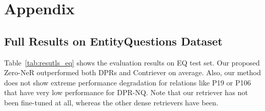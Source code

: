 \documentclass[letterpaper]{article} \usepackage{aaai23}  \usepackage{times}  \usepackage{helvet}  \usepackage{courier}  \usepackage[hyphens]{url}  \usepackage{graphicx} \urlstyle{rm} \def\UrlFont{\rm}  \usepackage{natbib}  \usepackage{caption} \frenchspacing  \setlength{\pdfpagewidth}{8.5in}  \setlength{\pdfpageheight}{11in}  \usepackage{algorithm}
\begin{document}




\appendix
\section{Appendix}\label{sec:appendix}


\subsection{Full Results on EntityQuestions Dataset}\label{sec:appendix_full_results}
Table~\ref{tab:resutls_eq} shows the evaluation results on EQ test set.
Our proposed Zero-NeR outperformed both DPRs and Contriever on average.
Also, our method does not show extreme performance degradation for relations like P19 or P106 that have very low performance for DPR-NQ.
Note that our retriever has not been fine-tuned at all, whereas the other dense retrievers have been.
\end{document}
